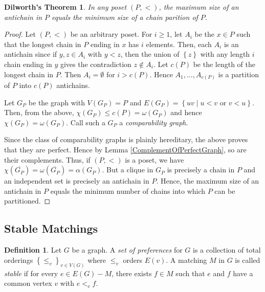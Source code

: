 \documentclass[12pt]{article}
\theoremstyle{plain}
\newtheorem*{Dilworth}{Dilworth's Theorem}
\theoremstyle{definition}
\newtheorem{defn}{Definition}[section]
\theoremstyle{remark}
\newcommand{\set}[1]{\left\{ #1 \right\}}
\newcommand{\setbs}[2]{\left\{ #1 \mid #2 \right\}}
\begin{document}
\begin{Dilworth}
In any poset $(P, <)$, the maximum size of an antichain in $P$ equals the minimum size of a chain parition of $P$.
\end{Dilworth}
\begin{proof}
Let $(P, <)$ be an arbitrary poset.  For $i \geq 1$, let $A_i$ be the $x \in P$ such that the longest chain in $P$ ending in $x$ has $i$ elements.  Then, each $A_i$ is an antichain since if $y, z \in A_i$ with $y < z$, then the union of $\set{z}$ with any length $i$ chain ending in $y$ gives the contradiction $z \not \in A_i$.  Let $c(P)$ be the length of the longest chain in $P$. Then $A_i = \emptyset$ for $i > c(P)$.  Hence $A_1, \ldots, A_{c(P)}$ is a partition of $P$ into $c(P)$ antichains.

Let $G_P$ be the graph with $V(G_P) = P$ and $E(G_P) = \setbs{uv}{u < v \text{ or } v < u}$.  Then, from the above, $\chi(G_P) \leq c(P) = \omega(G_P)$ and hence $\chi(G_P) = \omega(G_P)$.  Call such a $G_P$ a \emph{comparability graph}.

Since the class of comparability graphs is plainly hereditary, the above proves that they are perfect.  Hence by Lemma \ref{ComplementOfPerfectGraph}, so are their complements.  Thus, if $(P, <)$ is a poset, we have $\chi(\overline{G_P}) = \omega(\overline{G_P}) = \alpha(G_P)$.  But a clique in $G_P$ is precisely a chain in $P$ and an independent set is precisely an antichain in $P$.  Hence, the maximum size of an antichain in $P$ equals the minimum number of chains into which $P$ can be partitioned.
\end{proof}

\subsection{Stable Matchings}
\begin{defn}
Let $G$ be a graph.  A \emph{set of preferences} for $G$ is a collection of total orderings $\set{\leq_v}_{v \in V(G)}$ where $\leq_v$ orders $E(v)$.  A matching $M$ in $G$ is called \emph{stable} if for every $e \in E(G) - M$, there exists $f \in M$ such that $e$ and $f$ have a common vertex $v$ with $e <_v f$.
\end{defn}
\end{document}
